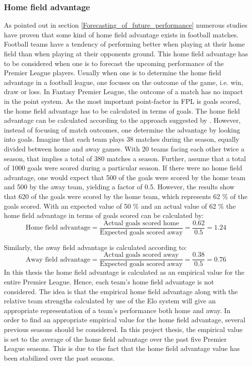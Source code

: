 \subsubsection{Home field advantage}
As pointed out in section \ref{Forecasting_of_future_performance} numerous studies have proven that some kind of home field advantage exists in football matches. Football teams have a tendency of performing better when playing at their home field than when playing at their opponents ground. This home field advantage has to be considered when one is to forecast the upcoming performance of the Premier League players. 
\newpar
Usually when one is to determine the home field advantage in a football league, one focuses on the outcome of the game, i.e.  win, draw or loss. In Fantasy Premier League, the outcome of a match has no impact in the point system. As the most important point-factor in FPL is goals scored, the home field advantage has to be calculated in terms of goals. 
\newpar
The home field advantage can be calculated according to the approach suggested by \cite{Pollard}. However, instead of focusing of match outcomes, one determine the advantage by looking into goals. Imagine that each team plays 38 matches during the season, equally divided between home and away games. With 20 teams facing each other twice a season, that implies a total of 380 matches a season. Further, assume that a total of 1000 goals were scored during a particular season. If there were no home field advantage, one would expect that 500 of the goals were scored by the home team and 500 by the away team, yielding a factor of 0.5. However, the results show that 620 of the goals were scored by the home team, which represents 62 \% of the goals scored. With an expected value of 50 \% and an actual value of 62 \% the home field advantage in terms of goals scored can be calculated by: 
\begin{equation*}
    \textrm{Home field advantage} = \frac{\textrm{Actual goals scored home}}{\textrm{Expected goals scored away}} = \frac{0.62}{0.5} = 1.24 
\end{equation*}

Similarly, the away field advantage is calculated according to:
\begin{equation*}
    \textrm{Away field advantage} = \frac{\textrm{Actual goals scored away}}{\textrm{Expected goals scored away}} = \frac{0.38}{0.5} = 0.76
\end{equation*}
\newpar
In this thesis the home field advantage is calculated as an empirical value for the entire Premier League. Hence, each team's home field advantage is not considered. The idea is that the empirical home field advantage along with the relative team strengths calculated by use of the Elo system will give an appropriate representation of a team's performance both home and away. 
\newpar
In order to find an appropriate empirical value for the home field advantage, several previous seasons should be considered. In this project thesis, the empirical value is set to the average of the home field advantage over the past five Premier League seasons. This is due to the fact that the home field advantage value has been stabilized over the past seasons. 

